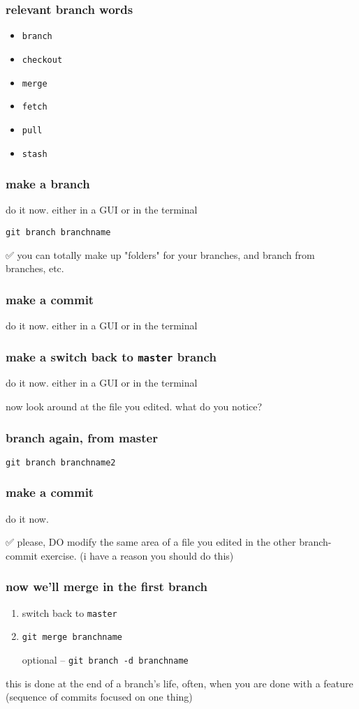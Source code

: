 \documentclass[14pt,aspectratio=1610]{beamer} %
\newcommand{\fframe}[2]{
   \begin{frame}
\frametitle{#1}
#2
\end{frame}
}
\begin{document}
\fframe{relevant branch words}
{
	 \begin{itemize}
		\item {\tt branch}
		\item {\tt checkout}
		\item {\tt merge}
		\item {\tt fetch}
		\item {\tt pull}
		\item {\tt stash}
	\end{itemize}
}


\fframe{make a branch}
{do it now.  either in a GUI or in the terminal

\vspace{\baselineskip}

{\tt git branch branchname}

\vspace{\baselineskip}

✅ you can totally make up "folders" for your branches, and branch from branches, etc.
}



\fframe{make a commit}
{do it now.  either in a GUI or in the terminal}

\fframe{make a switch back to {\tt master} branch}
{do it now.  either in a GUI or in the terminal


\vspace{\baselineskip}

now look around at the file you edited.  what do you notice?
}

\fframe{branch again, from master}
{
	{\tt git branch branchname2}
}


\fframe{make a commit}
{
do it now.  


\vspace{\baselineskip}

✅ 
please, DO modify the same area of a file you edited in the other branch-commit exercise.  (i have a reason you should do this)

}


\fframe{now we'll merge in the first branch}
{
	\begin{enumerate}
		\item switch back to {\tt master}
		\item {\tt git merge  branchname}
		\item [optional] -- {\tt git branch -d branchname}
	\end{enumerate}

\vspace{\baselineskip}

	this is done at the end of a branch's life, often, when you are done with a feature (sequence of commits focused on one thing)
}
\end{document}

